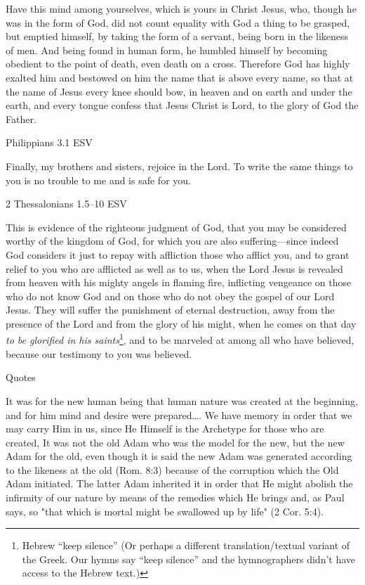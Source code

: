 \documentclass[
]{article}
\begin{document}
Have this mind among yourselves, which is yours in Christ Jesus, who,
though he was in the form of God, did not count equality with God a
thing to be grasped, but emptied himself, by taking the form of a
servant, being born in the likeness of men. And being found in human
form, he humbled himself by becoming obedient to the point of death,
even death on a cross. Therefore God has highly exalted him and bestowed
on him the name that is above every name, so that at the name of Jesus
every knee should bow, in heaven and on earth and under the earth, and
every tongue confess that Jesus Christ is Lord, to the glory of God the
Father.

Philippians 3.1 ESV

Finally, my brothers and sisters, rejoice in the Lord. To write the same
things to you is no trouble to me and is safe for you.

2 Thessalonians 1.5--10 ESV

This is evidence of the righteous judgment of God, that you may be
considered worthy of the kingdom of God, for which you are also
suffering---since indeed God considers it just to repay with affliction
those who afflict you, and to grant relief to you who are afflicted as
well as to us, when the Lord Jesus is revealed from heaven with his
mighty angels in flaming fire, inflicting vengeance on those who do not
know God and on those who do not obey the gospel of our Lord Jesus. They
will suffer the punishment of eternal destruction, away from the
presence of the Lord and from the glory of his might, when he comes on
that day \emph{to be glorified in his saints}\footnote{Hebrew ``keep
  silence'' (Or perhaps a different translation/textual variant of the
  Greek. Our hymns say ``keep silence'' and the hymnographers didn't
  have access to the Hebrew text.)}, and to be marveled at among all who
have believed, because our testimony to you was believed.

Quotes

It was for the new human being that human nature was created at the
beginning, and for him mind and desire were prepared\ldots. We have
memory in order that we may carry Him in us, since He Himself is the
Archetype for those who are created, It was not the old Adam who was the
model for the new, but the new Adam for the old, even though it is said
the new Adam was generated according to the likeness at the old (Rom.
8:3) because of the corruption which the Old Adam initiated. The latter
Adam inherited it in order that He might abolish the infirmity of our
nature by means of the remedies which He brings and, as Paul says, so
"that which is mortal might be swallowed up by life" (2 Cor. 5:4).
\end{document}
